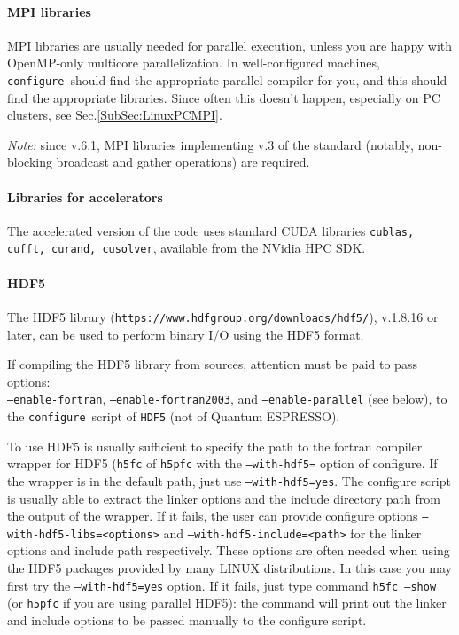 \documentclass[12pt,a4paper]{article}
\def\qe{{\sc Quantum ESPRESSO}}
\def\configure{\texttt{configure}}
\begin{document}
\paragraph{MPI libraries}
MPI libraries are usually needed for parallel execution, unless you are
happy with OpenMP-only multicore parallelization.
In well-configured machines, \configure\ should find the appropriate
parallel compiler for you, and this should find the appropriate
libraries. Since often this doesn't
happen, especially on PC clusters, see Sec.\ref{SubSec:LinuxPCMPI}.

{\em Note:} since v.6.1, MPI libraries implementing v.3 of the standard
(notably, non-blocking broadcast and gather operations) are required.

\paragraph{Libraries for accelerators}
The accelerated version of the code uses standard CUDA libraries 
\texttt{cublas, cufft, curand, cusolver}, available from the NVidia HPC SDK.

\paragraph {HDF5}
The HDF5 library (\texttt{https://www.hdfgroup.org/downloads/hdf5/}),
v.1.8.16 or later, can be used to perform binary I/O using the HDF5
format.

If compiling the HDF5 library from sources, attention must be paid
to pass options:\\
\texttt{--enable-fortran}, \texttt{--enable-fortran2003}, and 
\texttt{--enable-parallel} (see below),
to the \configure{}ript of \texttt{HDF5} (not of \qe).

To use HDF5 is usually sufficient to specify the path to the fortran
compiler wrapper for HDF5 (\texttt{h5fc} of \texttt{h5pfc} with the
\texttt{--with-hdf5=} option of configure. If the wrapper is in the
default path, just use \texttt{--with-hdf5=yes}.
The configure script is usually able to extract the linker options
and the include directory path from the output of the wrapper. If it
fails, the user can provide configure options
\texttt{--with-hdf5-libs=<options>} and \texttt{--with-hdf5-include=<path>}
for the linker options and include path respectively.
These options are often needed when using the HDF5 packages
provided by many LINUX distributions. In this case you may first try
the \texttt{--with-hdf5=yes} option. If it fails, just type command
\texttt{h5fc --show} (or \texttt{h5pfc} if you are using parallel HDF5):
the command will print out the linker and include options to be passed
manually to the configure script.
\end{document}
